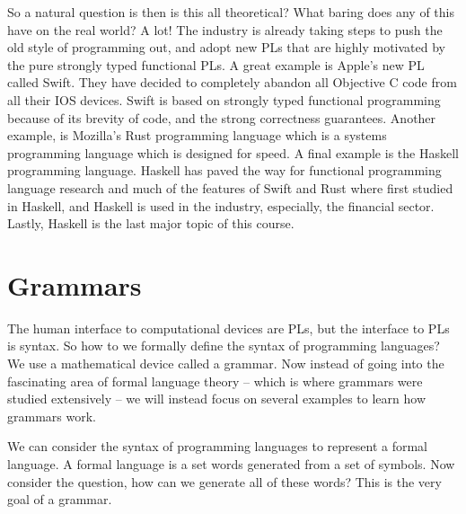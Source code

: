 \documentclass{article}
\begin{document}
So a natural question is then is this all theoretical?  What baring
does any of this have on the real world?  A lot!  The industry is
already taking steps to push the old style of programming out, and
adopt new PLs that are highly motivated by the pure strongly typed
functional PLs.  A great example is Apple's new PL called Swift.  They
have decided to completely abandon all Objective C code from all their
IOS devices.  Swift is based on strongly typed functional programming
because of its brevity of code, and the strong correctness guarantees.
Another example, is Mozilla's Rust programming language which is a
systems programming language which is designed for speed.  A final
example is the Haskell programming language.  Haskell has paved the
way for functional programming language research and much of the
features of Swift and Rust where first studied in Haskell, and Haskell
is used in the industry, especially, the financial sector.  Lastly,
Haskell is the last major topic of this course.

\section{Grammars}
\label{sec:grammars}
The human interface to computational devices are PLs, but the
interface to PLs is syntax.  So how to we formally define the syntax
of programming languages?  We use a mathematical device called a
grammar.  Now instead of going into the fascinating area of formal
language theory -- which is where grammars were studied extensively --
we will instead focus on several examples to learn how grammars work.

We can consider the syntax of programming languages to represent a
formal language.  A formal language is a set words generated from a
set of symbols.  Now consider the question, how can we generate all of
these words?  This is the very goal of a grammar.
\end{document}
